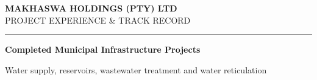 \documentclass[a4paper,landscape,10pt]{article}
\renewcommand{\arraystretch}{1.65}
\begin{document}
\noindent
\colorbox{MHNavy}{%
  \parbox{\dimexpr\textwidth-2\fboxsep\relax}{%
    \vspace{0.38cm}\hspace{0.37cm}%
    {\Large\bfseries\color{white}
    MAKHASWA HOLDINGS (PTY) LTD}\\[5pt]
    \hspace{0.37cm}%
    {\normalsize\color{white}
    PROJECT EXPERIENCE \& TRACK RECORD}%
    \vspace{0.35cm}%
  }%
}

\vspace{0.10cm}
\noindent
\color{MHGold}\rule{\textwidth}{1.5pt}

\vspace{0.62cm}

{\large\bfseries\color{MHNavy}
Completed Municipal Infrastructure Projects}\par

\vspace{0.16cm}

{\small\color{MHMuted}
Water supply, reservoirs, wastewater treatment
and water reticulation}\par

\vspace{0.43cm}

\begingroup

\fontsize{9.0pt}{11.8pt}\selectfont
\color{MHText}
\renewcommand{\arraystretch}{1.65}
\end{document}
